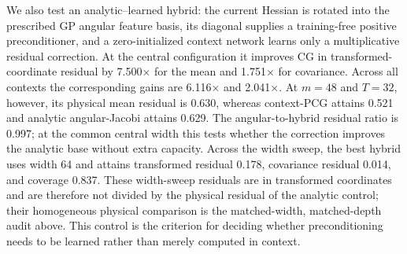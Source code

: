 \documentclass[10pt]{article}
\begin{document}
We also test an analytic--learned hybrid: the current Hessian is rotated into
the prescribed GP angular feature basis, its diagonal supplies a training-free
positive preconditioner, and a zero-initialized context network learns only a
multiplicative residual correction.  At the central configuration it improves
CG in transformed-coordinate residual by
7.500$\times$
for the mean and
1.751$\times$
for covariance.  Across all contexts the corresponding gains are
6.116$\times$
and
2.041$\times$.
At $m=48$ and $T=32$, however, its physical mean residual is
0.630,
whereas context-PCG attains
0.521
and analytic angular-Jacobi attains
0.629.
The angular-to-hybrid residual ratio is
0.997;
at the common central width this tests whether the correction improves the
analytic base without extra capacity.  Across the width sweep, the best hybrid
uses width 64 and attains transformed residual
0.178, covariance
residual
0.014, and
coverage 0.837.
These width-sweep residuals are in transformed coordinates and are therefore
not divided by the physical residual of the analytic control; their homogeneous
physical comparison is the matched-width, matched-depth audit above.
This control is the criterion for deciding whether preconditioning needs to be
learned rather than merely computed in context.
\end{document}
